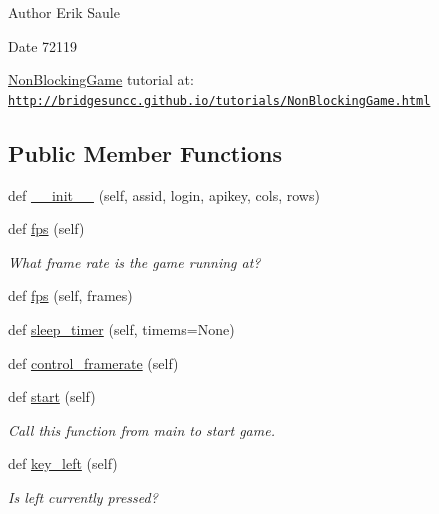 \begin{DoxyAuthor}{Author}
Erik Saule 
\end{DoxyAuthor}
\begin{DoxyDate}{Date}
72119
\end{DoxyDate}
\hyperlink{classbridges_1_1non__blocking__game_1_1_non_blocking_game}{Non\+Blocking\+Game} tutorial at\+: \href{http://bridgesuncc.github.io/tutorials/NonBlockingGame.html}{\tt http\+://bridgesuncc.\+github.\+io/tutorials/\+Non\+Blocking\+Game.\+html} \subsection*{Public Member Functions}
\begin{DoxyCompactItemize}
\item 
def \hyperlink{classbridges_1_1non__blocking__game_1_1_non_blocking_game_a19362773d256eec033f04cfd00b7160c}{\+\_\+\+\_\+init\+\_\+\+\_\+} (self, assid, login, apikey, cols, rows)
\item 
def \hyperlink{classbridges_1_1non__blocking__game_1_1_non_blocking_game_a5763c5a20f130943cec948a9f42803a0}{fps} (self)
\begin{DoxyCompactList}\small\item\em What frame rate is the game running at? \end{DoxyCompactList}\item 
def \hyperlink{classbridges_1_1non__blocking__game_1_1_non_blocking_game_a46b4b4a25c7c7ffc78126a7b693b7ceb}{fps} (self, frames)
\item 
def \hyperlink{classbridges_1_1non__blocking__game_1_1_non_blocking_game_a2e4dca6a290c65472200e69012e01d16}{sleep\+\_\+timer} (self, timems=None)
\item 
def \hyperlink{classbridges_1_1non__blocking__game_1_1_non_blocking_game_ad751eeccbf14adc09f9c11acce3757c9}{control\+\_\+framerate} (self)
\item 
def \hyperlink{classbridges_1_1non__blocking__game_1_1_non_blocking_game_ad6e23c265e1b710114459f0b666d25cb}{start} (self)
\begin{DoxyCompactList}\small\item\em Call this function from main to start game. \end{DoxyCompactList}\item 
def \hyperlink{classbridges_1_1non__blocking__game_1_1_non_blocking_game_a87490ef28d161f22e753aab5d3e67e46}{key\+\_\+left} (self)
\begin{DoxyCompactList}\small\item\em Is left currently pressed? \end{DoxyCompactList}\item 

\end{DoxyCompactItemize}
